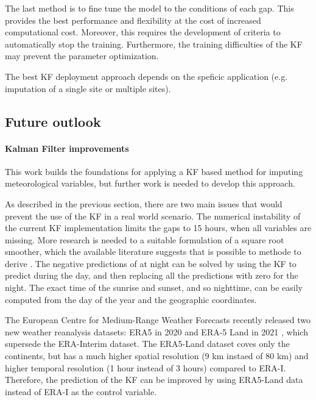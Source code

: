 \documentclass{article}
\let\Oldsubsection\subsection
\renewcommand{\subsection}{\FloatBarrier\Oldsubsection}
\begin{document}
The last method is to fine tune the model to the conditions of each gap. This provides the best performance and flexibility at the cost of increased computational cost. Moreover, this requires the development of criteria to automatically stop the training. Furthermore, the training difficulties of the KF may prevent the parameter optimization.

The best KF deployment approach depends on the speficic application (e.g. imputation of a single site or multiple sites).

\subsection{Future outlook}

\paragraph{Kalman Filter improvements} This work builds the foundations for applying a KF based method for imputing meteorological variables, but further work is needed to develop this approach.

As described in the previous section, there are two main issues that would prevent the use of the KF in a real world scenario.
The numerical instability of the current KF implementation limits the gaps to 15 hours, when all variables are missing.
More research is needed to a suitable formulation of a square root smoother, which the available literature suggests that is possible to methode to derive \cite{rutten_square-root_2013, park_new_1996}.
The negative predictions of  at night can be solved by using the KF to predict  during the day, and then replacing all the predictions with zero for the night. The exact time of the sunrise and sunset, and so nighttime, can be easily computed from the day of the year and the geographic coordinates.

The European Centre for Medium-Range Weather Forecasts recently released two new weather reanalysis datasets: ERA5 in 2020 \cite{hersbach_era5_2020} and ERA-5 Land  in 2021 \cite{munoz-sabater_era5-land_2021}, which supersede the ERA-Interim dataset. The ERA5-Land dataset coves only the continents, but has a much higher spatial resolution (9 km instaed of 80 km) and higher temporal resolution (1 hour instead of 3 hours) compared to ERA-I. Therefore, the prediction of the KF can be improved by using ERA5-Land data instead of ERA-I as the control variable.
\end{document}

